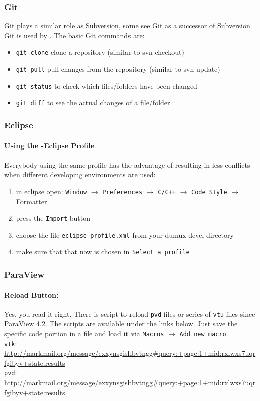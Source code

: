 \subsubsection{Git}
Git plays a similar role as Subversion, some see Git as a successor of Subversion. Git is used by \Dune. The basic
Git commands are:
\begin{itemize}
  \item \texttt{git clone} clone a repository (similar to svn checkout)
  \item \texttt{git pull} pull changes from the repository (similar to svn update)
  \item \texttt{git status} to check which files/folders have been changed
  \item \texttt{git diff} to see the actual changes of a file/folder
\end{itemize}

\subsubsection{Eclipse}
\paragraph{Using the \Dumux-Eclipse Profile}
Everybody using the same profile has the advantage of resulting in less conflicts
when different developing environments are used:
\begin{enumerate}
  \item in eclipse open: \texttt{Window} $\rightarrow$ \texttt{Preferences} $\rightarrow$
        \texttt{C/C++}  $\rightarrow$ \texttt{Code Style} $\rightarrow$ Formatter
  \item press the \texttt{Import} button
  \item choose the file \texttt{eclipse\_profile.xml} from your dumux-devel directory
  \item make sure that that now \Dumux is chosen in \texttt{Select a profile}
\end{enumerate}


\subsubsection{ParaView}
\paragraph{Reload Button:}
Yes, you read it right. There is script to reload \texttt{pvd} files or
series of \texttt{vtu} files since ParaView 4.2. The scripts are available
under the links below. Just save the specific code portion in a file and load
it via \texttt{Macros} $\rightarrow$ \texttt{Add new macro}.\\
\texttt{vtk}: \url{http://markmail.org/message/exxynsgishbvtngg#query:+page:1+mid:rxlwxs7uqrfgibyv+state:results}\\
\texttt{pvd}: \url{http://markmail.org/message/exxynsgishbvtngg#query:+page:1+mid:rxlwxs7uqrfgibyv+state:results}.


